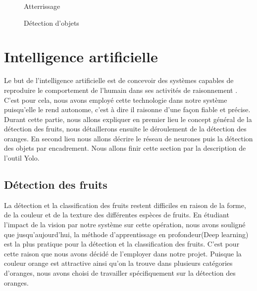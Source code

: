 \begin{figure}[H]
	\begin{minipage}{0.49\textwidth}
		\caption{Atterrissage }
	
	\end{minipage}
	\begin{minipage}{0.49\textwidth}
		\caption{Détection d'objets }
		
	\end{minipage}
\end{figure}
\section{Intelligence artificielle}
Le but de l'intelligence artificielle est de concevoir des systèmes capables de reproduire le comportement de l'humain dans ses activités de raisonnement \cite{PowerPoint}. C'est pour cela, nous avons employé cette technologie dans notre système puisqu'elle le rend autonome, c'est à dire il raisonne d'une façon fiable et précise. 
Durant cette partie, nous allons expliquer en premier lieu le concept général de la détection des fruits, nous détaillerons ensuite le déroulement de la détection des oranges. En second lieu nous allons décrire le réseau de neurones puis la détection des objets par encadrement. Nous allons finir cette section par la description de l'outil Yolo. 

\subsection{Détection des fruits}
La détection et la classification des fruits restent difficiles en raison de la forme, de la couleur et de la texture des différentes espèces de fruits. En étudiant l'impact de la vision par notre système sur cette opération, nous avons souligné que jusqu'aujourd'hui, la méthode d'apprentissage en profondeur(Deep learning) est la plus pratique pour la détection et la classification des fruits. C'est pour cette raison que nous avons décidé de l'employer dans notre projet. Puisque la couleur orange est attractive ainsi qu'on la trouve dans plusieurs catégories d'oranges, nous avons choisi de travailler spécifiquement sur la détection des oranges.
